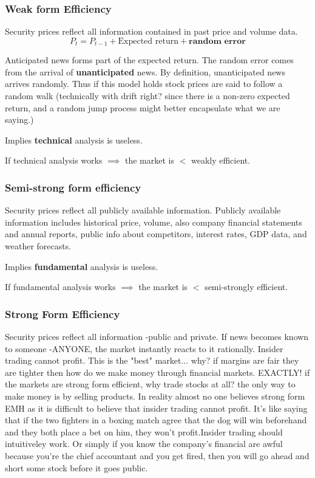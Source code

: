 \documentclass{article}
\begin{document}
\subsubsection{Weak form Efficiency}
Security prices reflect all information contained in past price and volume data. 
\[ P_t = P_{t-1}+ \text{Expected return} + \textbf{random error} \]
 
Anticipated news forms part of the expected return.  
The random error comes from the arrival of \textbf{unanticipated} news. By definition, unanticipated news arrives randomly. Thus if this model holds stock prices are said to follow a random walk (technically with drift right? since there is a non-zero expected return, and a random jump process might better encapsulate what we are saying.)

Implies \textbf{technical} analysis is useless.

If technical analysis works $\implies$ the market is $ < $ weakly efficient. 

\subsubsection{Semi-strong form efficiency}
Security prices reflect all publicly available information. Publicly available information includes historical price, volume, also company financial statements and annual reports, public info about competitors, interest rates, GDP data, and weather forecasts. 

Implies \textbf{fundamental} analysis is useless. 

If fundamental analysis works $\implies$ the market is $ < $ semi-strongly efficient. 

\subsubsection{Strong Form Efficiency}
Security prices reflect all information -public and private. If news becomes known to someone -ANYONE, the market instantly reacts to it rationally. Insider trading cannot profit. This is the "best" market... why? if margins are fair they are tighter then how do we make money through financial markets. EXACTLY! if the markets are strong form efficient, why trade stocks at all? the only way to make money is by selling products. In reality almost no one believes strong form EMH as it is difficult to believe that insider trading cannot profit. It's like saying that if the two fighters in a boxing match agree that the dog will win beforehand and they both place a bet on him, they won't profit.Insider trading should intuitiveley work. Or simply if you know the company's financial are awful because you're the chief accountant and you get fired, then you will go ahead and short some stock before it goes public. 
\end{document}
